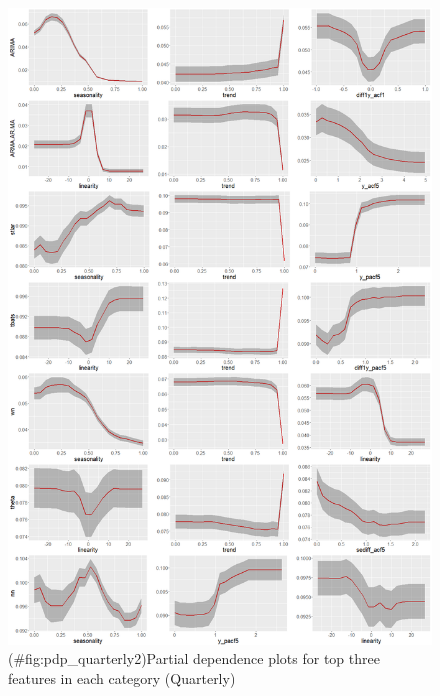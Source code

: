 \documentclass[11pt,a4paper,]{article}
\theoremstyle{definition}
\theoremstyle{definition}
\theoremstyle{definition}
\theoremstyle{remark}
\begin{document}
\begin{figure}
\centering
\includegraphics{figures/pdp_quarterly2-1.png}
\caption{(\#fig:pdp\_quarterly2)Partial dependence plots for top three
features in each category (Quarterly)}
\end{figure}

\newpage
\end{document}
